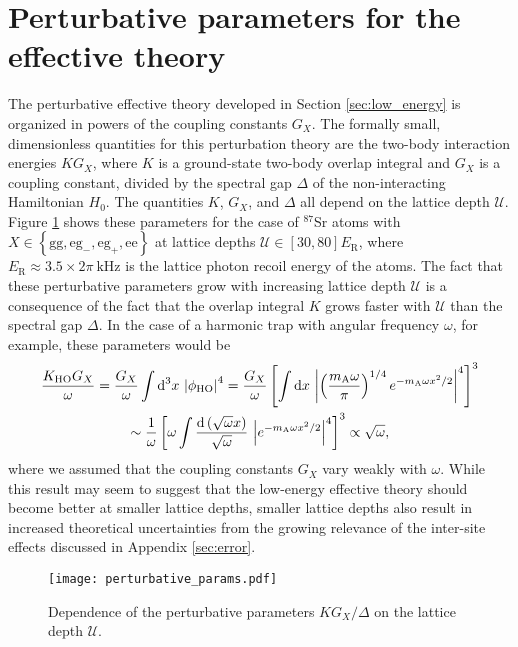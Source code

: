 \documentclass[preprint,showkeys,nofootinbib]{revtex4-1}
\renewcommand{\t}{\text} %
\newcommand{\f}{\dfrac} %
\newcommand{\p}[1]{\left(#1\right)} %
\renewcommand{\sp}[1]{\left[#1\right]} %
\renewcommand{\set}[1]{\left\{#1\right\}} %
\renewcommand{\d}{\text{d}}
\newcommand{\g}{\text{g}}
\newcommand{\e}{\text{e}}
\newcommand{\U}{\mathcal{U}}
\newcommand{\1}{\mathds{1}}
\newcommand{\mA}{m_{\text{A}}} %
\begin{document}
\section{Perturbative parameters for the effective theory}
\label{sec:pert_params}

The perturbative effective theory developed in Section
\ref{sec:low_energy} is organized in powers of the coupling constants
$G_X$.  The formally small, dimensionless quantities for this
perturbation theory are the two-body interaction energies $K G_X$,
where $K$ is a ground-state two-body overlap integral and $G_X$ is a
coupling constant, divided by the spectral gap $\Delta$ of the
non-interacting Hamiltonian $H_0$.  The quantities $K$, $G_X$, and
$\Delta$ all depend on the lattice depth $\U$.  Figure
\ref{fig:pert_params} shows these parameters for the case of
${}^{87}$Sr atoms with $X\in\set{\g\g, \e\g_-, \e\g_+, \e\e}$ at
lattice depths $\U\in\sp{30,80}E_{\t{R}}$, where
$E_{\t{R}}\approx3.5\times2\pi~\t{kHz}$ is the lattice photon recoil
energy of the atoms.  The fact that these perturbative parameters grow
with increasing lattice depth $\U$ is a consequence of the fact that
the overlap integral $K$ grows faster with $\U$ than the spectral gap
$\Delta$.  In the case of a harmonic trap with angular frequency
$\omega$, for example, these parameters would be
\begin{multline}
  \f{K_{\t{HO}} G_X}{\omega}
  = \f{G_X}{\omega} \int \d^3 x~\abs{\phi_{\t{HO}}}^4
  = \f{G_X}{\omega} \sp{\int \d x~
    \abs{\p{\f{\mA\omega}{\pi}}^{1/4} e^{-\mA\omega x^2/2}}^4}^3 \\
  \sim \f1{\omega}
  \sp{\omega \int\f{\d\p{\sqrt\omega x}}{\sqrt\omega}
    ~\abs{e^{-\mA\omega x^2/2}}^4}^3
  \propto \sqrt{\omega},
\end{multline}
where we assumed that the coupling constants $G_X$ vary weakly with
$\omega$.  While this result may seem to suggest that the low-energy
effective theory should become better at smaller lattice depths,
smaller lattice depths also result in increased theoretical
uncertainties from the growing relevance of the inter-site effects
discussed in Appendix \ref{sec:error}.

\begin{figure}
  \centering
  \texttt{[image: perturbative\_params.pdf]}
  \caption{\footnotesize Dependence of the perturbative parameters
    $KG_X/\Delta$ on the lattice depth $\U$.}
  \label{fig:pert_params}
\end{figure}
\end{document}
